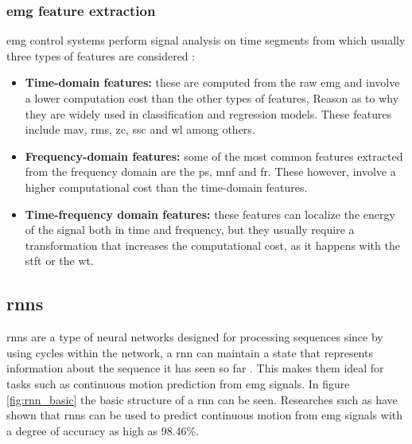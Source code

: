 \subsubsection{\acrshort{emg} feature extraction}

\acrshort{emg} control systems perform signal analysis on time segments from which usually three types of features are considered \cite{EMGprediction}:
\begin{itemize}
    \item \textbf{Time-domain features:} these are computed from the raw \acrfull{emg} and involve a lower computation cost than the other types of features,
    Reason as to why they are widely used in classification and regression models. These features include \acrfull{mav}, \acrfull{rms}, \acrfull{zc}, \acrfull{ssc} and \acrfull{wl}
    among others.
    \item \textbf{Frequency-domain features:} some of the most common features extracted from the frequency domain are the \acrfull{ps}, \acrfull{mnf} and \acrfull{fr}.
    These however, involve a higher computational cost than the time-domain features.
    \item \textbf{Time-frequency domain features:} these features can localize the energy of the signal both in time and frequency, but they usually
    require a transformation that increases the computational cost, as it happens with the \acrfull{stft} or the \acrfull{wt}.
\end{itemize}

\subsection{\acp{rnn}}
\acp{rnn} are a type of neural networks designed for processing sequences since by using cycles within the network, a \acrshort{rnn} can maintain a state that
represents information about the sequence it has seen so far \cite{RNNdef}. This makes them ideal for tasks such as continuous motion prediction from \acrshort{emg} signals.
In figure \ref{fig:rnn_basic} the basic structure of a \acrshort{rnn} can be seen.
Researches such as \cite{RNNEMG} have shown that \acp{rnn} can be used to predict continuous motion from \acrshort{emg} signals with a degree of 
accuracy as high as 98.46\%.

